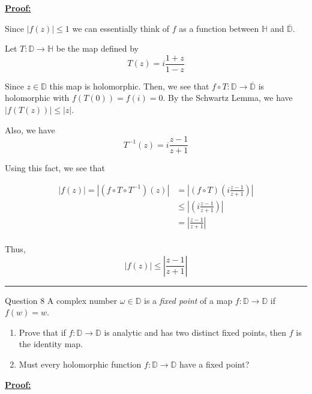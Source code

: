 \documentclass{article}
\begin{document}
\vskip 0.5cm
\underline{\textbf{Proof:}}

Since $|f(z)| \leq 1$ we can essentially think of $f$ as a function between $\mathbb{H}$ and $\overline{\mathbb{D}}$. 

\vsize 0.5cm
Let $T : \mathbb{D} \rightarrow \mathbb{H}$ be the map defined by \[ T(z) = i \frac{1+z}{1-z} \] 



Since $z \in \mathbb{D}$ this map is holomorphic. Then, we see that $f \circ T : \mathbb{D} \rightarrow \overline{\mathbb{D}}$ is holomorphic with $f(T(0)) = f(i) = 0$. By the Schwartz Lemma, we have $|f(T(z))| \leq |z|$. 


Also, we have 
\[ T^{-1}(z) = i\frac{z-1}{z+1} \]


Using this fact, we see that 

\begin{align*}
  |f(z)| = |\left(f \circ T \circ T^{-1}\right) (z)| &= \left| \left(f \circ T\right) \left(i \frac{z-1}{z+1}\right) \right| \\
  &\leq \left| \left(i  \frac{z-1}{z+1}\right) \right| \\
  &=\left| \frac{z-1}{z+1}\right| \\
\end{align*}

Thus, 
\[ \boxed{ |f(z)| \leq \left| \frac{z-1}{z+1} \right| } \]


\vskip 0.5cm
\hrule 
\vskip 0.5cm



\begin{mathdefinitionbox}{Question 8}
\vskip 0.5cm
A complex number $\omega \in \mathbb{D}$ is a \emph{fixed point} of a map $f : \mathbb{D} \rightarrow \mathbb{D}$ if $f(w) = w$.
\begin{enumerate}[label=(\alph*)]
  \item Prove that if $f : \mathbb{D} \rightarrow \mathbb{D}$ is analytic and has two distinct fixed points, then $f$ is the identity map.
  \item Must every holomorphic function $f : \mathbb{D} \rightarrow \mathbb{D}$ have a fixed point?
\end{enumerate}
\end{mathdefinitionbox}

\vskip 0.5cm
\underline{\textbf{Proof:}}
\end{document}
